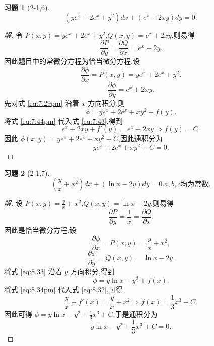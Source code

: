 \documentclass[twoside,11pt]{article}
\newtheorem*{cdtheorem}{习题}
\newenvironment{exercise}
{\begin{mdframed}[backgroundcolor=gray!40,rightline=false,leftline=false,topline=false,bottomline=false]\begin{cdtheorem}}
    {\end{cdtheorem}\end{mdframed}}
\newcommand{\pa}{\partial} \newcommand{\Om}{\Omega}
\begin{document}
\begin{exercise}[2-1,6]
$$
(ye^x+2e^x+y^2)dx+(e^x+2xy)dy=0.
$$  
\end{exercise}
\begin{proof}[解]
  令 $P(x,y)=ye^{x}+2e^x+y^2$,$Q(x,y)=e^x+2xy$.则易得
$$
\frac{\pa P}{\pa y}=\frac{\pa Q}{\pa x}=e^x+2y.
$$
因此题目中的常微分方程为恰当微分方程.设
\begin{equation}
  \label{eq:7.29pm}
  \frac{\pa\phi}{\pa x}=P(x,y)=ye^x+2e^x+y^2.
\end{equation}
\begin{equation}
  \label{eq:7.43}
  \frac{\pa \phi}{\pa y}=e^x+2xy.
\end{equation}
先对式 \eqref{eq:7.29pm} 沿着 $x$ 方向积分,则
\begin{equation}
  \label{eq:7.44pm}
  \phi=ye^x+2e^x+xy^2+f(y).
\end{equation}
将式 \eqref{eq:7.44pm} 代入式 \eqref{eq:7.43},得到
\begin{equation}
  \label{eq:7.48pm}
  e^x+2xy+f'(y)=e^x+2xy\Rightarrow f(y)=C.
\end{equation}
因此 $\phi(x,y)=ye^x+2e^x+xy^2+C$,因此通积分为
\begin{equation}
  \label{eq:7.51pm}
  ye^x+2e^x+xy^2+C=0.
\end{equation}
\end{proof}
\begin{exercise}[2-1,7]
$$
(\frac{y}{x}+x^2)dx+(\ln x-2y)dy=0.a,b,c\mbox{均为常数.}
$$  
\end{exercise}
\begin{proof}[解]
设 $P(x,y)=\frac{y}{x}+x^2$,$Q(x,y)=\ln x-2y$.则易得
\begin{equation}
  \label{eq:8.03pm}
  \frac{\pa P}{\pa y}=\frac{1}{x}=\frac{\pa Q}{\pa x}.
\end{equation}
因此是恰当微分方程.设
\begin{equation}
  \label{eq:8.32}
  \frac{\pa \phi}{\pa x}=P(x,y)=\frac{y}{x}+x^2,
\end{equation}
\begin{equation}
  \label{eq:8.33}
  \frac{\pa \phi}{\pa y}=Q(x,y)=\ln x-2y.
\end{equation}
将式 \eqref{eq:8.33} 沿着 $y$ 方向积分,得到
\begin{equation}
  \label{eq:8.34pm}
  \phi=y\ln x-y^2+f(x).
\end{equation}
将式 \eqref{eq:8.34pm} 代入式 \eqref{eq:8.32},可得
\begin{equation}
  \label{eq:8.39pm}
 \frac{y}{x}+f'(x)=\frac{y}{x}+x^2\Rightarrow f(x)=\frac{1}{3}x^3+C. 
\end{equation}
因此可得 $\phi=y\ln x-y^2+\frac{1}{3}x^3+C$.于是通积分为
$$
y\ln x-y^2+\frac{1}{3}x^3+C=0.
$$
\end{proof}
\end{document}
